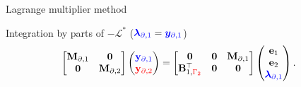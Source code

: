 \documentclass[aspectratio=169]{ISAE-Beamer}
\begin{document}
\begin{frame}{Lagrange multiplier method}
{\begin{exampleblock}{Integration by parts of $-\mathcal{L}^*$ ($\textcolor{blue}{\bm{\lambda}_{\partial, 1}}=\textcolor{blue}{\bm{y}_{\partial, 1}}$) }
\begin{equation*}
\begin{aligned}
\begin{bmatrix}
\mathbf{M}_{\partial, 1} & \mathbf{0} \\
\mathbf{0} & \mathbf{M}_{\partial, 2} \\
\end{bmatrix}
\begin{pmatrix}
\textcolor{blue}{\mathbf{y}_{\partial, 1}} \\
\textcolor{red}{\mathbf{y}_{\partial, 2}} \\
\end{pmatrix}
&= \begin{bmatrix}
\mathbf{0} & \mathbf{0} & \mathbf{M}_{\partial, 1} \\
\mathbf{B}_{1, \textcolor{red}{\Gamma_2}}^\top & \mathbf{0} & \mathbf{0} \\
\end{bmatrix}\begin{pmatrix}
\mathbf{e}_{1} \\
\mathbf{e}_{2} \\
\textcolor{blue}{\bm{\lambda}_{\partial, 1}} \\
\end{pmatrix}.
\end{aligned}
\end{equation*}
\end{exampleblock}
}



\end{frame}
\end{document}
